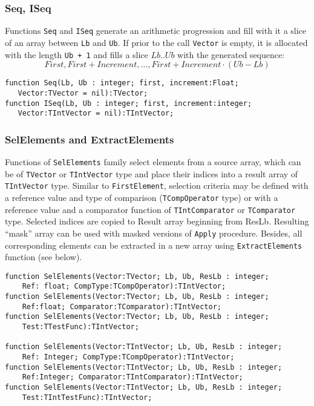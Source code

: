 \documentclass[12pt,a4paper,oneside]{article}
\newcommand{\code}[1]{\texttt{#1}}
\begin{document}
\subsubsection{Seq, ISeq}
Functions \code{Seq} and \code{ISeq} generate an arithmetic progression and fill with it a slice of an array between \code{Lb} and \code{Ub}. If prior to the call \code{Vector} is empty, it is allocated with the length \code{Ub + 1} and fills a slice $Lb..Ub$ with the generated sequence:
$$
 First, First + Increment, \dots, First + Increment \cdot (Ub-Lb)  
$$
\begin{verbatim}
function Seq(Lb, Ub : integer; first, increment:Float; 
   Vector:TVector = nil):TVector;
function ISeq(Lb, Ub : integer; first, increment:integer; 
   Vector:TIntVector = nil):TIntVector;
\end{verbatim}
\subsubsection{SelElements and ExtractElements}\label{sec:selelements}
Functions of \code{SelElements} family select elements from a source array, which can be of \code{TVector} or \code{TIntVector} type and place their indices into a result array of \code{TIntVector} type. Similar to \code{FirstElement}, selection criteria may be defined with a reference value and type of comparison (\code{TCompOperator} type) or with a reference value and a comparator function of \code{TIntComparator} or \code{TComparator} type.
Selected indices are copied to Result array beginning from ResLb.
Resulting ``mask'' array can be used with masked versions of \code{Apply} procedure. Besides, all corresponding elements can be extracted in a new array using \code{ExtractElements} function (see below).

\begin{verbatim}
function SelElements(Vector:TVector; Lb, Ub, ResLb : integer;
    Ref: float; CompType:TCompOperator):TIntVector;
function SelElements(Vector:TVector; Lb, Ub, ResLb : integer;
    Ref:float; Comparator:TComparator):TIntVector;
function SelElements(Vector:TVector; Lb, Ub, ResLb : integer;
    Test:TTestFunc):TIntVector;

function SelElements(Vector:TIntVector; Lb, Ub, ResLb : integer; 
    Ref: Integer; CompType:TCompOperator):TIntVector; 
function SelElements(Vector:TIntVector; Lb, Ub, ResLb : integer;
    Ref:Integer; Comparator:TIntComparator):TIntVector;
function SelElements(Vector:TIntVector; Lb, Ub, ResLb : integer;
    Test:TIntTestFunc):TIntVector;
\end{verbatim}
\end{document}
